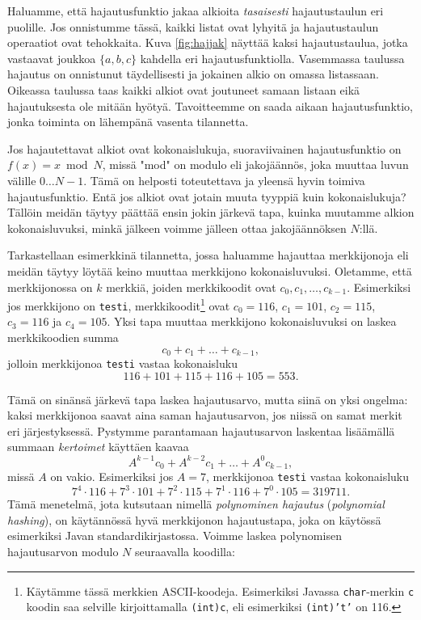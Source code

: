 Haluamme, että hajautusfunktio jakaa alkioita \emph{tasaisesti}
hajautustaulun eri puolille.
Jos onnistumme tässä, kaikki listat ovat lyhyitä ja
hajautustaulun operaatiot ovat tehokkaita.
Kuva \ref{fig:hajjak} näyttää kaksi hajautustaulua, jotka vastaavat
joukkoa $\{a,b,c\}$ kahdella eri hajautusfunktiolla.
Vasemmassa taulussa hajautus on onnistunut täydellisesti
ja jokainen alkio on omassa listassaan.
Oikeassa taulussa taas kaikki alkiot ovat joutuneet samaan
listaan eikä hajautuksesta ole mitään hyötyä.
Tavoitteemme on saada aikaan hajautusfunktio,
jonka toiminta on lähempänä vasenta tilannetta.

Jos hajautettavat alkiot ovat kokonaislukuja,
suoraviivainen hajautusfunktio on $f(x)=x \bmod N$,
missä "mod" on modulo eli jakojäännös,
joka muuttaa luvun välille $0 \dots N-1$.
Tämä on helposti toteutettava ja yleensä hyvin toimiva hajautusfunktio.
Entä jos alkiot ovat jotain muuta tyyppiä kuin kokonaislukuja?
Tällöin meidän täytyy päättää ensin jokin järkevä tapa,
kuinka muutamme alkion kokonaisluvuksi,
minkä jälkeen voimme jälleen ottaa jakojäännöksen $N$:llä.

Tarkastellaan esimerkkinä tilannetta, jossa haluamme hajauttaa merkkijonoja
eli mei\-dän täytyy löytää keino muuttaa merkkijono kokonaisluvuksi.
Oletamme, että merkkijonossa on $k$ merkkiä,
joiden merkkikoodit ovat $c_0,c_1,\dots,c_{k-1}$.
Esimerkiksi jos merkkijono on \texttt{testi},
merkkikoodit\footnote{Käytämme tässä merkkien ASCII-koodeja.
Esimerkiksi Javassa \texttt{char}-merkin \texttt{c} koodin saa
selville kirjoittamalla \texttt{(int)c}, eli esimerkiksi
\texttt{(int)'t'} on 116.} ovat $c_0=116$, $c_1=101$, $c_2=115$,
$c_3=116$ ja $c_4=105$.
Yksi tapa muuttaa merkkijono kokonaisluvuksi
on laskea merkkikoodien summa
\[ c_0 + c_1 + \dots + c_{k-1},\]
jolloin merkkijonoa \texttt{testi} vastaa kokonaisluku
\[116+101+115+116+105=553.\]


Tämä on sinänsä järkevä tapa laskea hajautusarvo, mutta siinä on yksi ongelma:
kaksi merkkijonoa saavat aina saman hajautusarvon,
jos niissä on samat merkit eri järjestyksessä.
Pystymme parantamaan hajautusarvon laskentaa lisäämällä
summaan \emph{kertoimet} käyttäen kaavaa
\[ A^{k-1} c_0 + A^{k-2} c_1 + \dots + A^0 c_{k-1},\]
missä $A$ on vakio.
Esimerkiksi jos $A=7$, merkkijonoa \texttt{testi} vastaa kokonaisluku
\[7^4 \cdot 116+7^3 \cdot 101+7^2 \cdot 115+7^1 \cdot 116+7^0 \cdot 105=319711.\]
Tämä menetelmä, jota kutsutaan nimellä \emph{polynominen hajautus}
(\emph{polynomial hashing}),
on käytän\-nössä hyvä merkkijonon hajautustapa,
joka on käytössä esimerkiksi Javan standardikirjastossa.
Voimme laskea polynomisen hajautusarvon modulo $N$ seuraavalla koodilla:

